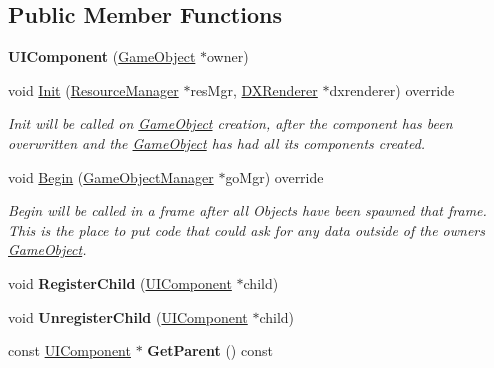 \subsection*{Public Member Functions}
\begin{DoxyCompactItemize}
\item 
\mbox{\label{classUIComponent_ab7b881b2d2604cbf0a96c4046abc5f04}} 
{\bfseries U\+I\+Component} (\hyperlink{classGameObject}{Game\+Object} $\ast$owner)
\item 
void \hyperlink{classUIComponent_ab4632b919bcdf5954cbee5c32b01a38d}{Init} (\hyperlink{classResourceManager}{Resource\+Manager} $\ast$res\+Mgr, \hyperlink{classDXRenderer}{D\+X\+Renderer} $\ast$dxrenderer) override
\begin{DoxyCompactList}\small\item\em Init will be called on \hyperlink{classGameObject}{Game\+Object} creation, after the component has been overwritten and the \hyperlink{classGameObject}{Game\+Object} has had all its components created. \end{DoxyCompactList}\item 
void \hyperlink{classUIComponent_ace6f4cbb1c52f59378b3a33c127dda2c}{Begin} (\hyperlink{classGameObjectManager}{Game\+Object\+Manager} $\ast$go\+Mgr) override
\begin{DoxyCompactList}\small\item\em Begin will be called in a frame after all Objects have been spawned that frame. This is the place to put code that could ask for any data outside of the owner\textquotesingle{}s \hyperlink{classGameObject}{Game\+Object}. \end{DoxyCompactList}\item 
\mbox{\label{classUIComponent_a18bda3b790b4daeefd3177faa43aec54}} 
void {\bfseries Register\+Child} (\hyperlink{classUIComponent}{U\+I\+Component} $\ast$child)
\item 
\mbox{\label{classUIComponent_adcb498cb2275edd50622bba422b79788}} 
void {\bfseries Unregister\+Child} (\hyperlink{classUIComponent}{U\+I\+Component} $\ast$child)
\item 
\mbox{\label{classUIComponent_ab4148b5b50cdb2e678126f3aca78e06e}} 
const \hyperlink{classUIComponent}{U\+I\+Component} $\ast$ {\bfseries Get\+Parent} () const
\item 

\end{DoxyCompactItemize}

